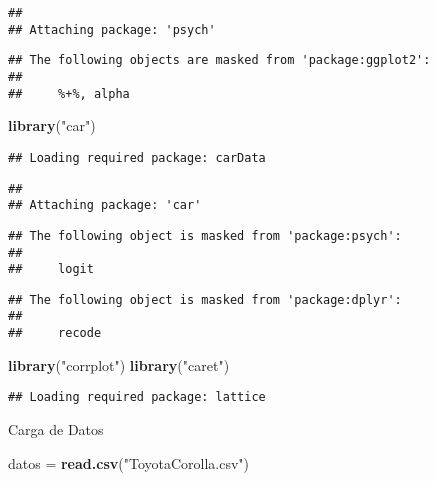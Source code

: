 \documentclass[
]{article}
\newenvironment{Shaded}{\begin{snugshade}}{\end{snugshade}}
\newcommand{\KeywordTok}[1]{\textcolor[rgb]{0.13,0.29,0.53}{\textbf{#1}}}
\newcommand{\NormalTok}[1]{#1}
\newcommand{\StringTok}[1]{\textcolor[rgb]{0.31,0.60,0.02}{#1}}
\begin{document}
\begin{verbatim}
## 
## Attaching package: 'psych'
\end{verbatim}

\begin{verbatim}
## The following objects are masked from 'package:ggplot2':
## 
##     %+%, alpha
\end{verbatim}

\begin{Shaded}
\begin{Highlighting}[]
\KeywordTok{library}\NormalTok{(}\StringTok{"car"}\NormalTok{)}
\end{Highlighting}
\end{Shaded}

\begin{verbatim}
## Loading required package: carData
\end{verbatim}

\begin{verbatim}
## 
## Attaching package: 'car'
\end{verbatim}

\begin{verbatim}
## The following object is masked from 'package:psych':
## 
##     logit
\end{verbatim}

\begin{verbatim}
## The following object is masked from 'package:dplyr':
## 
##     recode
\end{verbatim}

\begin{Shaded}
\begin{Highlighting}[]
\KeywordTok{library}\NormalTok{(}\StringTok{"corrplot"}\NormalTok{)}
\KeywordTok{library}\NormalTok{(}\StringTok{"caret"}\NormalTok{)}
\end{Highlighting}
\end{Shaded}

\begin{verbatim}
## Loading required package: lattice
\end{verbatim}

Carga de Datos

\begin{Shaded}
\begin{Highlighting}[]
\NormalTok{datos =}\StringTok{ }\KeywordTok{read.csv}\NormalTok{(}\StringTok{"ToyotaCorolla.csv"}\NormalTok{)}
\end{Highlighting}
\end{Shaded}
\end{document}

